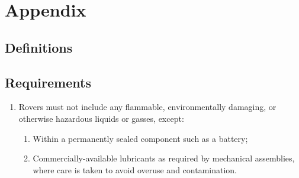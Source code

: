 \section{Appendix}
\subsection{Definitions}
\subsection{Requirements}

\begin{enumerate}
    \item Rovers must not include any flammable, environmentally damaging, or otherwise hazardous liquids or gasses, except:
    \begin{enumerate}
        \item Within a permanently sealed component such as a battery;
        \item Commercially-available lubricants as required by mechanical assemblies, where care is taken to avoid overuse and contamination.
    \end{enumerate}
\end{enumerate}
